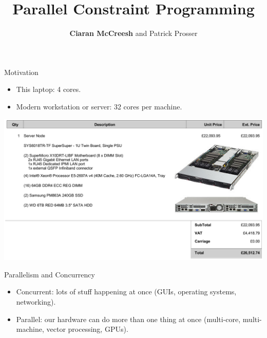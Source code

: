 \documentclass{beamer}
\title{Parallel Constraint Programming}
\author[Ciaran McCreesh and Patrick Prosser]{\textbf{Ciaran McCreesh} and Patrick Prosser}
\begin{document}
{
    \begin{frame}
        \titlepage
    \end{frame}
}

\begin{frame}{Motivation}
    \begin{itemize}
        \item This laptop: 4 cores.
        \item Modern workstation or server: 32 cores per machine.
    \end{itemize}

    \centering
    \includegraphics[keepaspectratio=true,scale=0.1]{fatanode.png}
\end{frame}

\begin{frame}{Parallelism and Concurrency}
    \begin{itemize}
        \item Concurrent: lots of stuff happening at once (GUIs, operating systems, networking).

        \item Parallel: our hardware can do more than one thing at once (multi-core, multi-machine,
            vector processing, GPUs).
    \end{itemize}
\end{frame}
\end{document}
